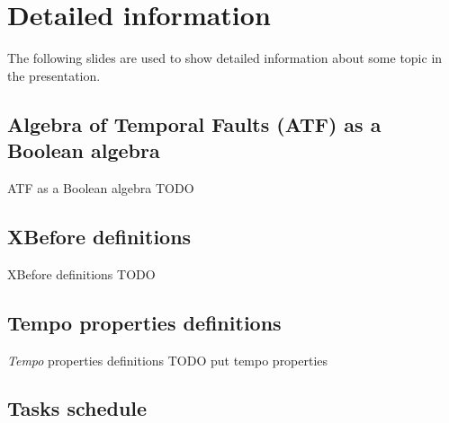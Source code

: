 \documentclass{beamer}
\def\ATF{%
	Algebra of Temporal Faults (ATF)%
	\gdef\ATF{ATF\xspace}%
	\gdef\iATF{an ATF\xspace}%
	\gdef\IATF{An ATF\xspace}%
	\xspace%
}
\def\iATF{%
	an Algebra of Temporal Faults (ATF)%
	\gdef\ATF{ATF\xspace}%
	\gdef\iATF{an ATF\xspace}%
	\gdef\IATF{An ATF\xspace}%
	\xspace%
}
\def\IATF{%
	An Algebra of Temporal Faults (ATF)%
	\gdef\ATF{ATF\xspace}%
	\gdef\iATF{an ATF\xspace}%
	\gdef\IATF{An ATF\xspace}%
	\xspace%
}
\begin{document}
\begin{frame}[label=end]
\titlepage
\end{frame}

\section{Detailed information}

\begin{frame}[noframenumbering]
	The following slides are used to show detailed information about some topic in the presentation.
\end{frame}

\subsection{\ATF as a Boolean algebra}

\begin{frame}[noframenumbering]{\ATF as a Boolean algebra}
	TODO 
\end{frame}

\subsection{XBefore definitions}

\begin{frame}[noframenumbering]{XBefore definitions}
	TODO 
\end{frame}

\subsection{Tempo properties definitions}

\begin{frame}[noframenumbering,label=tempodetail]{\emph{Tempo} properties definitions}
	TODO put tempo properties
	\hyperlink{tempo}{}
\end{frame}

\subsection{Tasks schedule}
\end{document}
